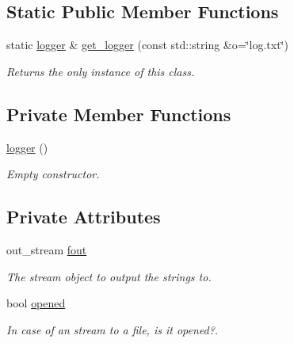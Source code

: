 \subsection*{Static Public Member Functions}
\begin{DoxyCompactItemize}
\item 
static \hyperlink{classlgraph_1_1utils_1_1logger}{logger} \& \hyperlink{classlgraph_1_1utils_1_1logger_af9d53836a2c37c72a08cf14f7e071abb}{get\-\_\-logger} (const std\-::string \&o=\char`\"{}log.\-txt\char`\"{})
\begin{DoxyCompactList}\small\item\em Returns the only instance of this class. \end{DoxyCompactList}\end{DoxyCompactItemize}
\subsection*{Private Member Functions}
\begin{DoxyCompactItemize}
\item 
\hyperlink{classlgraph_1_1utils_1_1logger_ace2028a4b282e3cb6593f6f62fee2f2b}{logger} ()
\begin{DoxyCompactList}\small\item\em Empty constructor. \end{DoxyCompactList}\end{DoxyCompactItemize}
\subsection*{Private Attributes}
\begin{DoxyCompactItemize}
\item 
\hypertarget{classlgraph_1_1utils_1_1logger_aafc1693e642fc967fed16b78d5cd8a5f}{out\-\_\-stream \hyperlink{classlgraph_1_1utils_1_1logger_aafc1693e642fc967fed16b78d5cd8a5f}{fout}}\label{classlgraph_1_1utils_1_1logger_aafc1693e642fc967fed16b78d5cd8a5f}

\begin{DoxyCompactList}\small\item\em The stream object to output the strings to. \end{DoxyCompactList}\item 
\hypertarget{classlgraph_1_1utils_1_1logger_a2e159433db285ccfc8120a4aa4ea7481}{bool \hyperlink{classlgraph_1_1utils_1_1logger_a2e159433db285ccfc8120a4aa4ea7481}{opened}}\label{classlgraph_1_1utils_1_1logger_a2e159433db285ccfc8120a4aa4ea7481}

\begin{DoxyCompactList}\small\item\em In case of an stream to a file, is it opened?. \end{DoxyCompactList}\end{DoxyCompactItemize}


